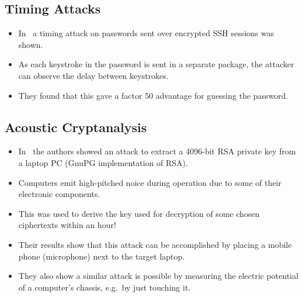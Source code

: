 \documentclass{beamer}
\begin{document}
\subsection{Timing Attacks}

\begin{frame}{\insertsubsectionhead}
  \begin{itemize}
    \item In~\cite{song2001timing} a timing attack on passwords sent over 
      encrypted SSH sessions was shown.

    \item As each keystroke in the password is sent in a separate package, the 
      attacker can observe the delay between keystrokes.

    \item They found that this gave a factor 50 advantage for guessing the 
      password.
  \end{itemize}
\end{frame}

\subsection{Acoustic Cryptanalysis}

\begin{frame}{\insertsubsectionhead}
  \begin{itemize}
    \item In~\cite{genkin2013rsa} the authors showed an attack to extract 
      a 4096-bit RSA private key from a laptop PC (GnuPG implementation of 
      RSA).

    \item Computers emit high-pitched noice during operation due to some of 
      their electronic components.

    \item This was used to derive the key used for decryption of some chosen 
      ciphertexts within an hour!

    \item Their results show that this attack can be accomplished by placing 
      a mobile phone (microphone) next to the target laptop.

    \item They also show a similar attack is possible by measuring the electric 
      potential of a computer's chassis, e.g.\ by just touching it.
  \end{itemize}
\end{frame}
\end{document}
